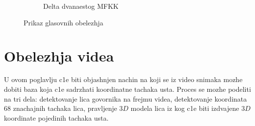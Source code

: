 \documentclass[a4paper, openany, oneside, 11pt]{book}
\begin{document}
\begin{figure}[!h]
\begin{subfigure}{0.475\textwidth}
            \caption{Delta dvanaestog \acrshort{MFKK}}
            \label{fig:6b}
            \vspace{0pt}
        \end{subfigure}
        \caption{Prikaz glasovnih obelezhja}
        \label{fig:6}
\end{figure}

\chapter{Obelezhja videa}
U ovom poglavlju c1e biti objashnjen nachin na koji se iz video snimaka mozhe dobiti baza koja c1e sadrzhati koordinatne tachaka usta. Proces se mozhe podeliti na tri dela: detektovanje lica govornika na frejmu videa, detektovanje koordinata 68 znachajnih tachaka lica, pravljenje $3D$ modela lica iz kog c1e biti izdvajene $3D$ koordinate pojedinih tachaka usta.
\end{document}
